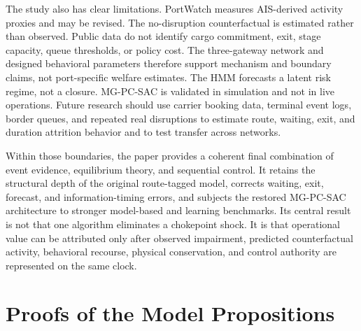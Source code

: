 \documentclass[a4paper,fleqn]{cas-sc}
\begin{document}
The study also has clear limitations. PortWatch measures AIS-derived activity
proxies and may be revised. The no-disruption counterfactual is estimated rather
than observed. Public data do not identify cargo commitment, exit, stage
capacity, queue thresholds, or policy cost. The three-gateway network and
designed behavioral parameters therefore support mechanism and boundary claims,
not port-specific welfare estimates. The HMM forecasts a latent risk regime, not
a closure. MG-PC-SAC is validated in simulation and not in live operations.
Future research should use carrier booking data, terminal event logs, border
queues, and repeated real disruptions to estimate route, waiting, exit, and
duration attrition behavior and
to test transfer across networks.

Within those boundaries, the paper provides a coherent final combination of
event evidence, equilibrium theory, and sequential control. It retains the
structural depth of the original route-tagged model, corrects waiting, exit,
forecast, and information-timing errors, and subjects the restored MG-PC-SAC
architecture to stronger model-based and learning benchmarks. Its central
result is not that one algorithm eliminates a chokepoint shock. It is that
operational value can be attributed only after observed impairment, predicted
counterfactual activity, behavioral recourse, physical conservation, and
control authority are represented on the same clock.

\label{numerical}
























% 








\appendix



\section{Proofs of the Model Propositions}
\label{app:proofs}
\end{document}
